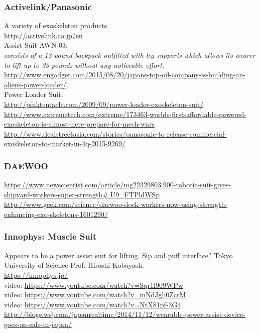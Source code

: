 \subsubsection{Activelink/Panasonic} 

\noindent
A variety of exoskeleton products.\\
\url{http://activelink.co.jp/en}\\

Assist Suit AWN-03:\\
{\it consists of a 13-pound backpack outfitted with leg supports which allows its wearer to lift up to 33 pounds without any noticeable effort.}\\
\url{http://www.engadget.com/2015/08/20/japans-top-oil-company-is-building-an-aliens-power-loader/}\\

Power Loader Suit:\\
\url{http://pinktentacle.com/2009/09/power-loader-exoskeleton-suit/}\\
\url{http://www.extremetech.com/extreme/173463-worlds-first-affordable-powered-exoskeleton-is-almost-here-prepare-for-mech-wars}\\
\url{http://www.dealstreetasia.com/stories/panasonic-to-release-commercial-exoskeleton-to-market-in-4q-2015-9269/}\\

\subsubsection{DAEWOO}

\noindent
\url{https://www.newscientist.com/article/mg22329803.900-robotic-suit-gives-shipyard-workers-super-strength#.U9_FTPldWSp}\\
\url{http://www.geek.com/science/daewoo-dock-workers-now-using-strength-enhancing-exo-skeletons-1601290/}\\

\subsubsection{Innophys: Muscle Suit}

\noindent
Appears to be a power assist suit for lifting. Sip and puff interface?
Tokyo University of Science Prof. Hiroshi Kobayash.\\
\url{https://innophys.jp/}\\
video: \url{https://www.youtube.com/watch?v=Sqr1l909WPw}\\
video: \url{https://www.youtube.com/watch?v=mNdJgh0ZcrM}\\
video: \url{https://www.youtube.com/watch?v=NtX81pf-3G4}\\
\url{http://blogs.wsj.com/japanrealtime/2014/11/12/wearable-power-assist-device-goes-on-sale-in-japan/}

